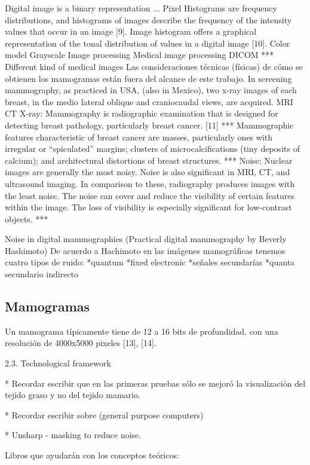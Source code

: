 Digital image is a binary representation ...
Pixel
Histograms are frequency distributions, and histograms of images describe the frequency of the intensity values that occur in an image [9]. Image histogram offers a graphical representation of the tonal distribution of values in a digital image [10].
Color model
Grayscale
Image processing
Medical image processing
DICOM
***
Different kind of medical images
Las consideraciones técnicas (físicas) de cómo se obtienen los mamogramas están fuera del alcance de este trabajo. In screening mammography, as practiced in USA, (also in Mexico), two x-ray images of each breast, in the medio lateral oblique and craniocaudal views, are acquired. 
MRI
CT
X-ray:
Mammography is radiographic examination that is designed for detecting breast pathology, particularly breast cancer. [11]
***
Mammographic features characteristic of breast cancer are masses, particularly ones with irregular or “spiculated” margins; clusters of microcalcifications (tiny deposits of calcium); and architectural distortions of breast structures. 
***
Noise: 
Nuclear images are generally the most noisy. Noise is also significant in MRI, CT, and ultrasound imaging. In comparison to these, radiography produces images with the least noise. 
The noise can cover and reduce the visibility of certain features within the image. The loss of visibility is especially significant for low-contrast objects.
***


Noise in digital mammographies (Practical digital mammography by Beverly Hashimoto)
De acuerdo a Hachimoto en las imágenes mamográficas tenemos cuatro tipos de ruido:
*quantum
*fixed electronic
*señales secundarías
*quanta secundario indirecto

\subsection{Mamogramas}

Un mamograma típicamente tiene de 12 a 16 bits de profundidad, con una
resolución de 4000x5000 pixeles [13], [14].  

2.3. Technological framework


* Recordar escribir que en las primeras pruebas sólo se mejoró  la visualización del tejido graso y no del tejido mamario.


* Recordar escribir sobre (general purpose computers)


* Unsharp - masking to reduce noise.


Libros que ayudarán con los conceptos teóricos:


